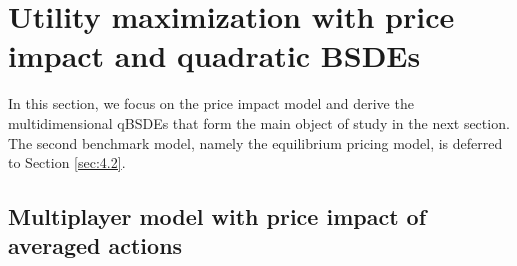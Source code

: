 \documentclass[10pt,a4paper]{article}
\theoremstyle{plain}
\theoremstyle{definition}
\numberwithin{equation}{section}
\begin{document}


\section{Utility maximization with price impact and quadratic BSDEs}
\label{sec2}


In this section, we focus on the price impact model and derive the multidimensional qBSDEs that form the main object of study in the next section. The second benchmark model, namely the equilibrium pricing model, is deferred to Section \ref{sec:4.2}.



\subsection{Multiplayer model with price impact of averaged actions}
\label{sec2.1}
\end{document}
